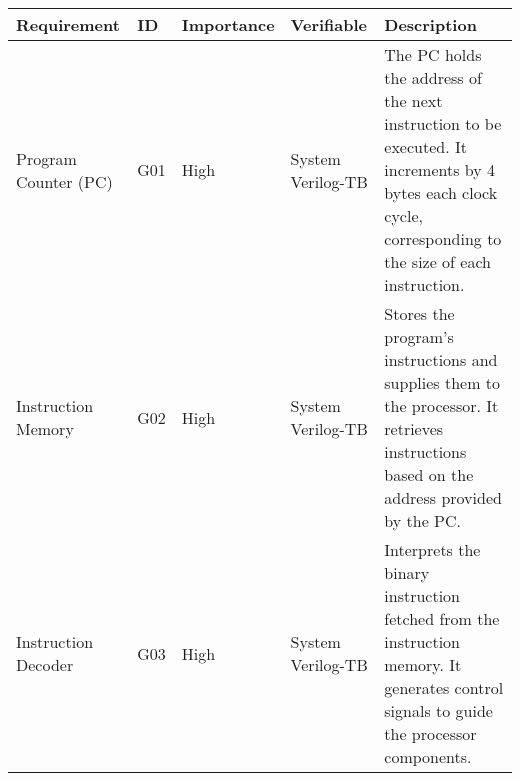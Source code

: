 \newpage
{}
\begin{longtable}{|p{3.5cm}|p{1cm}|p{2.5cm}|p{2cm}|p{6.5cm}|}
 \hline
 \textbf{Requirement} & \textbf{ID} & \textbf{Importance} & \textbf{Verifiable} & \textbf{Description} \\
 \hline
 \hline
Program Counter (PC) & G01 & High & System Verilog-TB &The PC holds the address of the next instruction to be executed. It increments by 4 bytes each clock cycle, corresponding to the size of each instruction.
\\
 \hline
  Instruction Memory & G02 & High & System Verilog-TB & Stores the program's instructions and supplies them to the processor. It retrieves instructions based on the address provided by the PC.
\\
\hline
Instruction Decoder & G03 & High & System Verilog-TB & Interprets the binary instruction fetched from the instruction memory. It generates control signals to guide the processor components.
\\
    

\end{longtable}
